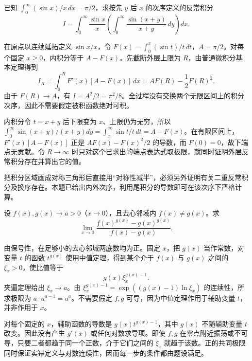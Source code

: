 \documentclass[UTF8,12pt,a4paper,fontset=fandol]{ctexart}
\begin{document}
\begin{example}\label{nm-2020-1d}
已知 $\int_0^\infty(\sin x)/x\,dx=\pi/2$，求按先 $y$ 后 $x$ 的次序定义的反常积分
\[
 I=\int_0^\infty\frac{\sin x}{x}
 \left(\int_0^\infty\frac{\sin(x+y)}{x+y}\,dy\right)dx.
\]
\end{example}
\begin{solve}
在原点以连续延拓定义 $\sin x/x$，令 $F(x)=\int_0^x(\sin t)/t\,dt$，$A=\pi/2$。对每个固定 $x\geq0$，内积分等于 $A-F(x)$。先截断外层上限为 $R$，由普通微积分基本定理得到
\[
 I_R=\int_0^R F'(x)[A-F(x)]\,dx
 =AF(R)-\frac12F(R)^2.
\]
由于 $F(R)\to A$，有 $I= A^2/2=\pi^2/8$。全过程没有交换两个无限区间上的积分次序，因此不需要假定被积函数绝对可积。

内积分令 $t=x+y$ 后下限变为 $x$、上限仍为无穷，所以 $\int_0^\infty\sin(x+y)/(x+y)dy=\int_x^\infty\sin t/t\,dt=A-F(x)$。在有限区间上，$F'(x)[A-F(x)]$ 正是 $AF(x)-F(x)^2/2$ 的导数，而 $F(0)=0$，故下端点无贡献。令 $R\to\infty$ 时只对这个已求出的端点表达式取极限，就同时证明外层反常积分存在并算出它的值。

\end{solve}
\begin{remark}
把积分区域画成对称三角形后直接用“对称性减半”，必须另外证明有关二重反常积分及换序存在。本题已给出内外次序，利用尾积分的导数即可在该次序下严格计算。
\end{remark}

\begin{example}\label{nm-2020-1e}
设 $f(x),g(x)\to a>0$（$x\to0$），且去心邻域内 $f(x)\ne g(x)$。求
\[
 \lim_{x\to0}\frac{f(x)^{g(x)}-g(x)^{g(x)}}{f(x)-g(x)}.
\]
\end{example}
\begin{solve}
由保号性，在足够小的去心邻域两底数均为正。固定 $x$，把 $g(x)$ 当作常数，对变量 $t$ 的函数 $t^{g(x)}$ 使用中值定理，得到某个介于 $f(x)$ 与 $g(x)$ 之间的 $\xi_x>0$，使比值等于
\[
 g(x)\xi_x^{g(x)-1}.
\]
夹逼定理给出 $\xi_x\to a$。由 $\xi_x^{g(x)-1}=\exp((g(x)-1)\ln\xi_x)$ 的连续性，所求极限为 $a\cdot a^{a-1}=a^a$。不需要假定 $f,g$ 可导，因为中值定理作用于辅助变量 $t$，并非作用于 $x$。

对每个固定的 $x$，辅助函数的导数是 $g(x)t^{g(x)-1}$，其中 $g(x)$ 不随辅助变量 $t$ 改变。因此没有产生 $g'(x)$ 或任何对数求导项。即使 $f,g$ 在零点附近振荡或不可导，只要二者都趋于同一个正数，介于它们之间的 $\xi_x$ 就趋于该数。正的共同极限同时保证实幂定义与对数连续性，因而每一步的条件都由题设满足。

\end{solve}
\end{document}
